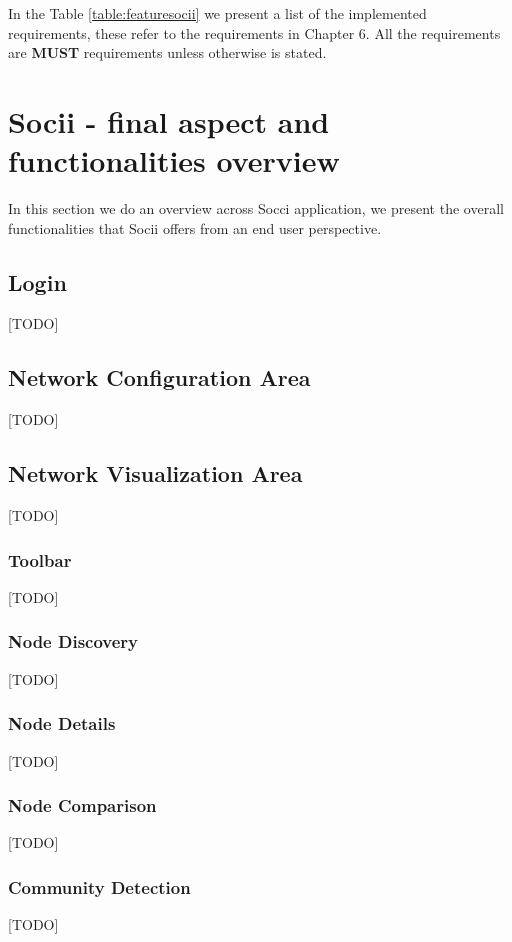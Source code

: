 In the Table \ref{table:featuresocii} we present a list of the implemented requirements, these refer to the requirements in Chapter 6. All the requirements are \textbf{MUST} requirements unless otherwise is stated.

\section{Socii - final aspect and functionalities overview}
In this section we do an overview across Socci application, we present the overall functionalities that Socii offers
from an end user perspective.

\subsection{Login}
[TODO]

\subsection{Network Configuration Area}
[TODO]

\subsection{Network Visualization Area}
[TODO]

\subsubsection{Toolbar}
[TODO]

\subsubsection{Node Discovery}
[TODO]

\subsubsection{Node Details}
[TODO]

\subsubsection{Node Comparison}
[TODO]

\subsubsection{Community Detection}
[TODO]


